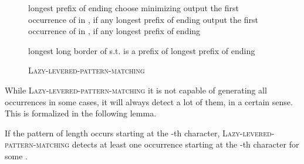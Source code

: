 \documentclass[runningheads]{llncs}
\newcommand{\proc}[1]{\textnormal{\scshape#1}}
\begin{document}
\begin{figure*}
\begin{algorithm}[H]
\caption{\proc{Lazy-levered-pattern-matching}}
\begin{algorithmic}[1]
\State  longest prefix of  ending  
\State 
{} 
  \State choose  minimizing 
  \If{}
     \State output the first occurrence of  in , if any 
     \State  longest prefix of  ending  \label{line:aperiodic 1}
     \State 
  \Else
     \State output the first occurrence of  in , if any  
      \label{line:modify start}
       \State  longest prefix of  ending  \label{line:aperiodic 2}
     \EndIf \label{line:modify end}

     \label{line:while after occurrence}
      \State 
      \State 
    \EndIf
    \State  longest long border of  s.t.  is a prefix of  
      \State  longest prefix of  ending 
    \EndIf
    \State 
    \State  \label{line:while ends}
  \EndIf
\EndWhile
\end{algorithmic}
\end{algorithm}
\vspace{-0.5cm}
\end{figure*}


While \proc{Lazy-levered-pattern-matching} it is not capable of generating all occurrences in some cases, it will always detect a lot of them, in a certain sense. This is formalized in the following lemma.

\begin{lemma}
\label{lemma:aperiodic lots of occurrences}
If the pattern of length  occurs starting at the -th character, \proc{Lazy-levered-pattern-matching} detects at least one occurrence starting at the -th character for some .
\end{lemma}
\end{document}
